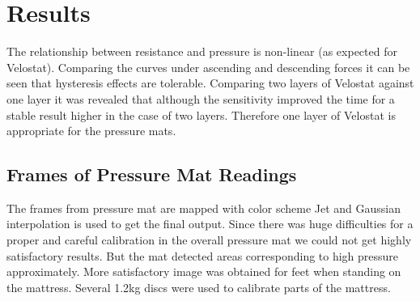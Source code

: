 \chapter{Results}
\label{chapter:results}

% 


% 
 



% 



% 




The relationship between resistance and pressure is non-linear (as expected for Velostat). Comparing the curves under ascending and descending forces it can be seen that hysteresis effects are tolerable. Comparing two layers of Velostat against one layer it was revealed that although the sensitivity improved the time for a stable result higher in the case of two layers. Therefore one layer of Velostat is appropriate for the pressure mats. 

\section{Frames of Pressure Mat Readings}
The frames from pressure mat are mapped with color scheme Jet and Gaussian interpolation is used to get the final output. Since there was huge difficulties for a proper and careful calibration in the overall pressure mat we could not get highly satisfactory results. But the mat detected areas corresponding to high pressure approximately. More satisfactory image was obtained for feet when standing on the mattress. Several 1.2kg discs were used to calibrate parts of the mattress. 

